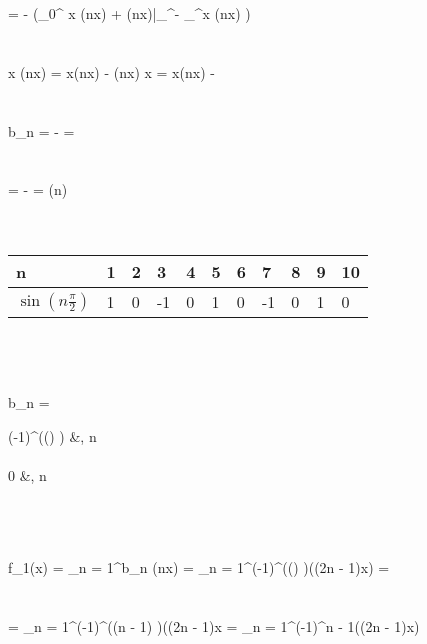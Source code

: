 \documentclass[10pt]{article}
\newcommand{\Sum}{\displaystyle\sum_{n = 1}^\infty}
\begin{document}
    = - \left(\int_0^ x \; \cos(nx) + \pi\cos(nx)\Big|_^\pi  - \int_^\pi x \; \cos(nx)  \right) \\\\\\
    \int x \; \cos(nx) = x\cos(nx) - \int \cos(nx) \; x = x\cos(nx) -  \implies \\\\\\
    b_n = -  = \\\\\\
    = -  = \sin\left(n\right) \\\\\\
	\begin{tabular}{|l|l|l|l|l|l|l|l|l|l|l|}
	\hline
	n & 1 & 2 & 3  & 4 & 5 & 6 & 7  & 8 & 9 & 10 \\ \hline
	\(\sin\left(n\frac{\pi}{2}\right)\) & 1 & 0 & -1 & 0 & 1 & 0 & -1 & 0 & 1 & 0 \\ \hline
	\end{tabular} \implies \\\\\\
	b_n = \begin{cases}
	(-1)^{(() )} &, \; n   \\\\
	0 &, \; n  
	\end{cases} \\\\\\
	f_1(x) = \Sum b_n \sin(nx) = \Sum {}(-1)^{(() )}\sin((2n - 1)x) = \\\\\\
	= \Sum {}(-1)^{((n - 1) )}\sin((2n - 1)x = \Sum {}(-1)^{n - 1}\sin((2n - 1)x)\)
\end{document}
